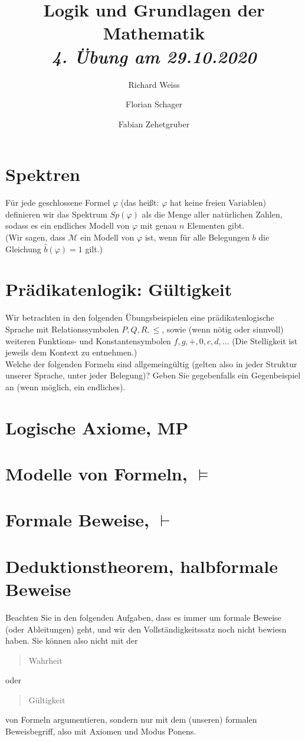 \documentclass{article}
\title
{
  Logik und Grundlagen der Mathematik \\
  \vspace{4pt}
  \normalsize
  \textit{4. Übung am 29.10.2020}
}
\author
{
  Richard Weiss
  \and
  Florian Schager
  \and
  Fabian Zehetgruber
}
\date{}
\begin{document}
\maketitle

\section*{Spektren}

Für jede geschlossene Formel $\varphi$ (das heißt: $\varphi$ hat keine freien Variablen)
definieren wir das Spektrum $Sp(\varphi)$ als die Menge aller natürlichen Zahlen,
sodass es ein endliches Modell von $\varphi$ mit genau $n$ Elementen gibt. \\
(Wir sagen, dass $\mathcal{M}$ ein Modell von $\varphi$ ist, wenn für alle Belegungen
$b$ die Gleichung $\hat{b}(\varphi) = 1$ gilt.)



\section*{Prädikatenlogik: Gültigkeit}

Wir betrachten in den folgenden Übungsbeispielen eine prädikatenlogische Sprache
mit Relationssymbolen $P, Q, R, \leq$, sowie (wenn nötig oder sinnvoll) weiteren
Funktions- und Konstantensymbolen $f, g, +, 0, c, d, \dots$
(Die Stelligkeit ist jeweils dem Kontext zu entnehmen.) \\
Welche der folgenden Formeln sind allgemeingültig (gelten also in jeder Struktur
unserer Sprache, unter jeder Belegung)?
Geben Sie gegebenfalls ein Gegenbeispiel an (wenn möglich, ein endliches).



\section*{Logische Axiome, MP}



\section*{Modelle von Formeln, $\vDash$}



\section*{Formale Beweise, $\vdash$}




\section*{Deduktionstheorem, halbformale Beweise}

Beachten Sie in den folgenden Aufgaben, dass es immer um formale Beweise (oder Ableitungen)
geht, und wir den Vollständigkeitssatz noch nicht bewiesn haben. Sie können also
nicht mit der \blockquote{Wahrheit} oder \blockquote{Gültigkeit} von Formeln argumentieren,
sondern nur mit dem (unseren) formalen Beweisbegriff, also mit Axiomen und Modus Ponens.


\end{document}
